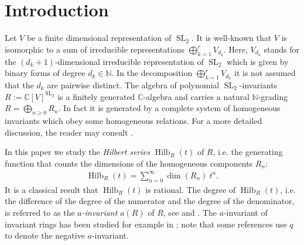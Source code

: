 \documentclass{amsart}
\theoremstyle{definition}
\theoremstyle{remark}
\newcommand{\C}{\mathbb{C}}
\newcommand{\N}{\mathbb{N}}
\newcommand{\SL}{\operatorname{SL}}
\newcommand{\Hilb}{\operatorname{Hilb}}
\begin{document}
\section{Introduction}
\label{sec:Intro}


Let $V$ be a finite dimensional representation of $\SL_2$. It is well-known that $V$ is isomorphic to a sum of
irreducible representations $\bigoplus_{k=1}^r V_{d_k}$. Here, $V_{d_k}$ stands for the $(d_k+1)$-dimensional
irreducible  representation of $\SL_2$ which is given by binary forms of degree $d_k\in \N$. In the decomposition $\bigoplus_{k=1}^r V_{d_k}$ it is not assumed that  the $d_k$ are pairwise distinct. The algebra of polynomial
$\SL_2$-invariants $R:=\C[V]^{\SL_2}$ is a finitely generated $\C$-algebra and carries a natural $\N$-grading
$R=\bigoplus_{n\ge 0} R_n$. In fact it is generated by a complete system of homogeneous invariants which obey some
homogeneous relations. For a more detailed discussion, the reader may consult \cite{DerskenKemperBook,PopovVinberg}.

In this paper we study the \emph{Hilbert series} $\Hilb_R(t)$ of $R$, i.e. the generating function that counts the dimensions of the homogeneous components $R_n$:
\begin{align*}
\Hilb_R(t)= \sum_{n=0}^\infty \dim(R_n)\: t^n.
\end{align*}
It is a classical result that $\Hilb_R(t)$ is rational. The degree of $\Hilb_R(t)$, i.e. the difference of the degree of the numerator and the degree of the denominator, is referred to as the \emph{$a$-invariant} $a(R)$ of $R$, see
\cite[Definitions 3.6.13 and 4.4.4]{BrunsHerzog} and \cite[Section 3]{GotoWatanabe}. The $a$-invariant of invariant
rings has been studied for example in \cite{CowieHerbigSeatonHerden,Knop,KnopLittelmann,PopovBook}; note that some references use $q$ to denote the negative $a$-invariant.
\end{document}
